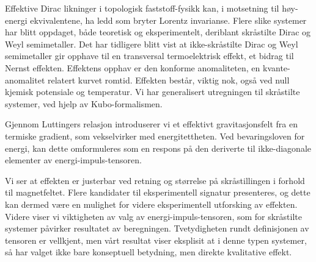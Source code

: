 Effektive Dirac likninger i topologisk faststoff-fysikk kan, i motsetning til høy-energi ekvivalentene, ha ledd som bryter Lorentz invarianse.
Flere slike systemer har blitt oppdaget, både teoretisk og eksperimentelt, deriblant skråstilte Dirac og Weyl semimetaller.
Det har tidligere blitt vist at ikke-skråstilte Dirac og Weyl semimetaller gir opphave til en transversal  termoelektrisk effekt, et bidrag til Nernst effekten.
Effektens opphav er den konforme anomaliteten, en kvante-anomalitet relatert kurvet romtid.
Effekten består, viktig nok, også ved null kjemisk potensiale og temperatur.
Vi har generalisert utregningen til skråstilte systemer, ved hjelp av Kubo-formalismen.

Gjennom Luttingers relasjon introduserer vi et effektivt gravitasjonsfelt fra en termiske gradient, som vekselvirker med energitettheten.
Ved bevaringsloven for energi, kan dette omformuleres som en respons på den deriverte til ikke-diagonale elementer av energi-impuls-tensoren.

Vi ser at effekten er justerbar ved retning og størrelse på skråstillingen i forhold til magnetfeltet.
Flere kandidater til eksperimentell signatur presenteres, og dette kan dermed være en mulighet for videre eksperimentell utforsking av effekten.
Videre viser vi viktigheten av valg av energi-impuls-tensoren, som for skråstilte systemer påvirker resultatet av beregningen.
Tvetydigheten rundt definisjonen av tensoren er vellkjent, men vårt resultat viser eksplisit at i denne typen systemer, så har valget ikke bare konseptuell betydning, men direkte kvalitative effekt.
